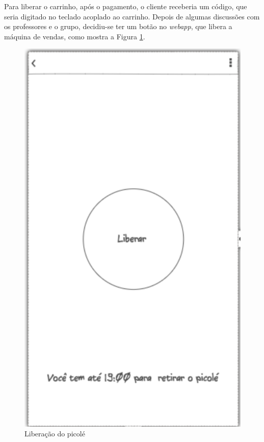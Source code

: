 \newpage

Para liberar o carrinho, após o pagamento, o cliente receberia um código, que seria digitado no teclado acoplado ao carrinho. Depois de algumas discussões com os professores e o grupo, decidiu-se ter um botão no \textit{webapp}, que libera a máquina de vendas, como mostra a Figura \ref{fig:liberacao}.

\begin{figure}[H]
	\centering
    \includegraphics[scale=0.7]{figuras/liberacao}
	\caption{Liberação do picolé}
    \label{fig:liberacao}
\end{figure}

